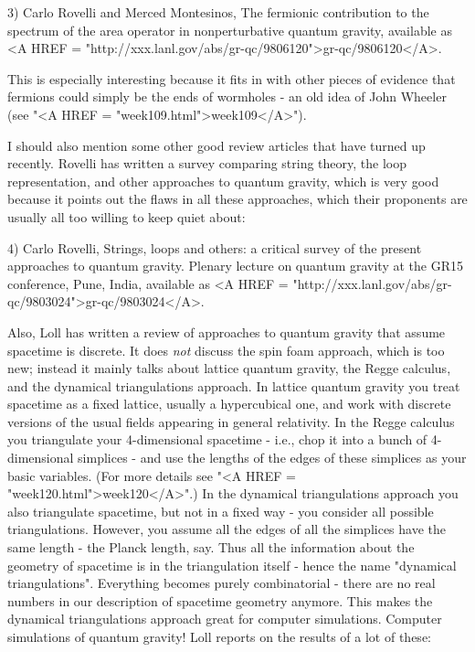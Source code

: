 3) Carlo Rovelli and Merced Montesinos, The fermionic contribution
to the spectrum of the area operator in nonperturbative quantum 
gravity, available as
<A HREF = "http://xxx.lanl.gov/abs/gr-qc/9806120">gr-qc/9806120</A>.

This is especially interesting because it fits in with other pieces
of evidence that fermions could simply be the ends of wormholes - an
old idea of John Wheeler (see "<A HREF = "week109.html">week109</A>").

I should also mention some other good review articles that have turned 
up recently.  Rovelli has written a survey comparing string theory, 
the loop representation, and other approaches to quantum gravity,
which is very good because it points out the flaws in all these approaches,
which their proponents are usually all too willing to keep quiet about:

4) Carlo Rovelli, Strings, loops and others: a critical survey of the
present approaches to quantum gravity.  Plenary lecture on quantum
gravity at the GR15 conference, Pune, India, available as
<A HREF = "http://xxx.lanl.gov/abs/gr-qc/9803024">gr-qc/9803024</A>.

Also, Loll has written a review of approaches to quantum gravity that
assume spacetime is discrete.  It does \emph{not} discuss the spin foam
approach, which is too new; instead it mainly talks about lattice
quantum gravity, the Regge calculus, and the dynamical triangulations
approach.  In lattice quantum gravity you treat spacetime as a fixed
lattice, usually a hypercubical one, and work with discrete versions of
the usual fields appearing in general relativity.  In the Regge calculus
you triangulate your 4-dimensional spacetime - i.e., chop it into a
bunch of 4-dimensional simplices - and use the lengths of the edges of
these simplices as your basic variables. (For more details see "<A
HREF = "week120.html">week120</A>".)  In the dynamical
triangulations approach you also triangulate spacetime, but not in a
fixed way - you consider all possible triangulations.  However, you
assume all the edges of all the simplices have the same length - the
Planck length, say.  Thus all the information about the geometry of
spacetime is in the triangulation itself - hence the name
"dynamical triangulations".  Everything becomes purely
combinatorial - there are no real numbers in our description of
spacetime geometry anymore.  This makes the dynamical triangulations
approach great for computer simulations.  Computer simulations of
quantum gravity!  Loll reports on the results of a lot of these:

